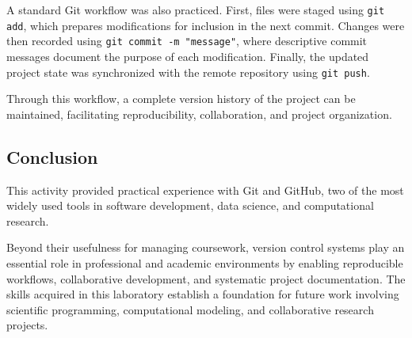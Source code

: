 \documentclass[../portafolio.tex]{subfiles}
\begin{document}
A standard Git workflow was also practiced. First, files were staged using \verb|git add|, which prepares modifications for inclusion in the next commit. Changes were then recorded using \verb|git commit -m "message"|, where descriptive commit messages document the purpose of each modification. Finally, the updated project state was synchronized with the remote repository using \verb|git push|.

Through this workflow, a complete version history of the project can be maintained, facilitating reproducibility, collaboration, and project organization.

\subsection{Conclusion}

This activity provided practical experience with Git and GitHub, two of the most widely used tools in software development, data science, and computational research.

Beyond their usefulness for managing coursework, version control systems play an essential role in professional and academic environments by enabling reproducible workflows, collaborative development, and systematic project documentation. The skills acquired in this laboratory establish a foundation for future work involving scientific programming, computational modeling, and collaborative research projects.
\end{document}
